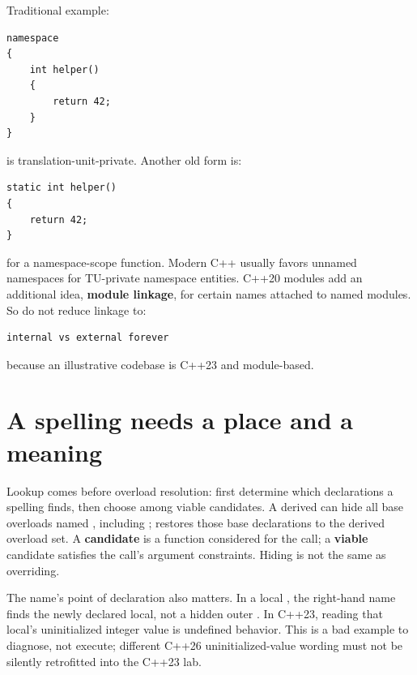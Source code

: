 \hypertarget{05-engine-i-ch002-linkage-is-related-to-odr-but-is-not-odr}{}

Traditional example:

\begin{verbatim}
namespace
{
    int helper()
    {
        return 42;
    }
}
\end{verbatim}

 is translation-unit-private. Another old form is:

\begin{verbatim}
static int helper()
{
    return 42;
}
\end{verbatim}

for a namespace-scope function. Modern C++ usually favors unnamed namespaces for TU-private namespace entities. C++20 modules add an additional idea, \textbf{module linkage}, for certain names attached to named modules. So do not reduce linkage to:

\begin{verbatim}
internal vs external forever
\end{verbatim}

because an illustrative codebase is C++23 and module-based.

\section{A spelling needs a place and a meaning}\label{05-engine-i-ch002-a-spelling-needs-a-place-and-a-meaning}

\hypertarget{05-engine-i-ch002-a-spelling-needs-a-place-and-a-meaning}{}

Lookup comes before overload resolution: first determine which declarations a spelling finds, then choose among viable candidates. A derived  can hide all base overloads named , including ;  restores those base declarations to the derived overload set. A \textbf{candidate} is a function considered for the call; a \textbf{viable} candidate satisfies the call's argument constraints. Hiding is not the same as overriding.

The name's point of declaration also matters. In a local , the right-hand name finds the newly declared local, not a hidden outer . In C++23, reading that local's uninitialized integer value is undefined behavior. This is a bad example to diagnose, not execute; different C++26 uninitialized-value wording must not be silently retrofitted into the C++23 lab.

